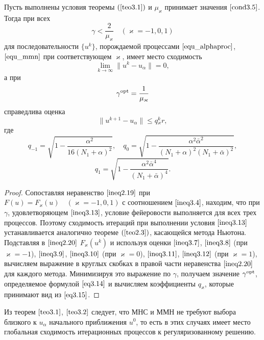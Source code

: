 \begin{theorem}\label{teo3.2}
	Пусть выполнены условия теоремы $(\ref{teo3.1})$ и $\mu_\varkappa$ принимает значения $\eqref{cond3.5}$. Тогда при всех
	\begin{equation}\label{ineq3.13}
	\gamma <\frac{2}{\mu _\varkappa}\quad (\varkappa=-1,0,1)
	\end{equation}
	для последовательности $\{u^k\}$, порождаемой процессами $\eqref{equ_alphaproc}$, $\eqref{equ_mmn}$ при соответствующем $\varkappa$, имеет место сходимость $$\lim_{k\to\infty}\|u^k-u_\alpha\|=0,$$ а при 
	\begin{equation}\label{eq3.14}
	\gamma^{\textnormal{opt}}=\frac{1}{\mu_\varkappa}
	\end{equation}
	справедлива оценка $$\|u^{k+1}-u_\alpha\|\le q{_\varkappa^k}r,$$ где
	$$q_{-1}=\sqrt{1-\frac{\alpha^2}{16(N_1+\alpha)^2}}, \quad q_0=\sqrt{1-\frac{\alpha^2\bar\alpha^2}{(N_1+\alpha)^2(N_1+\bar\alpha)^2}},$$
	\begin{equation}\label{eq3.15}
	q_1=\sqrt{1-\frac{\alpha^2\bar\alpha^4}{(N_1+\bar\alpha)^4}}.
	\end{equation}
\end{theorem}
\begin{proof} Сопоставляя неравенство $\eqref{ineq2.19}$ при $F(u)=F_\varkappa(u) \quad (\varkappa=-1,0,1)$ с соотношением $\eqref{ineq3.4}$, находим, что при $\gamma$, удовлетворяющем  $\eqref{ineq3.13}$, условие фейеровости выполняется для всех трех процессов. Поэтому сходимость итераций при выполнении условия $\eqref{ineq3.13}$ устанавливается аналогично теореме $(\ref{teo2.3})$, касающейся метода Ньютона. Подставляя в $\eqref{ineq2.20}$ $F_\varkappa(u^k)$ и используя оценки $\eqref{ineq3.7}$, $\eqref{ineq3.8}$ (при $\varkappa=-1$), $\eqref{ineq3.9}$, $\eqref{ineq3.10}$ (при $\varkappa=0$), $\eqref{ineq3.11}$, $\eqref{ineq3.12}$ (при $\varkappa=1$), вычисляем выражение в круглых скобках в правой части неравенства $\eqref{ineq2.20}$ для каждого метода. Минимизируя это выражение по $\gamma$, получаем значение $\gamma^{\textnormal{opt}}$, определяемое формулой $\eqref{eq3.14}$ и вычисляем коэффициенты $q_\varkappa$, которые принимают вид из $\eqref{eq3.15}$.
\end{proof}

\begin{remark}
	Из теорем $\eqref{teo3.1}$, $\eqref{teo3.2}$ следует, что МНС и ММН не требуют выбора близкого к $u_\alpha$ начального приближения $u^0$, то есть в этих случаях имеет место глобальная сходимость итерационных процессов к регуляризованному решению.
\end{remark}

